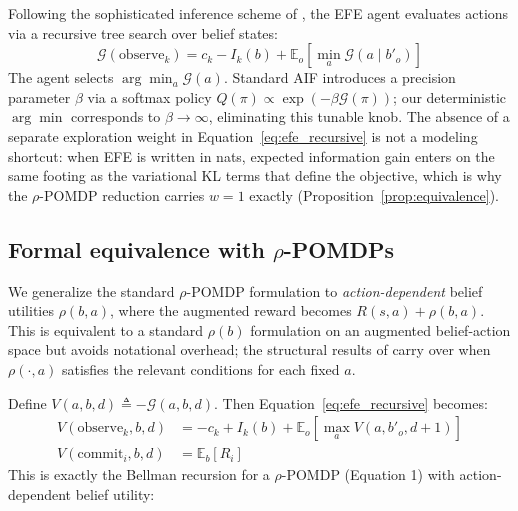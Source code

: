 \documentclass[runningheads]{llncs}
\begin{document}
Following the sophisticated inference scheme of \citet{friston2021}, the EFE agent evaluates actions via a recursive tree search over belief states:
\begin{equation}
    \mathcal{G}(\text{observe}_k) = c_k - I_k(b) + \mathbb{E}_{o}\!\left[\min_a \mathcal{G}(a \mid b'_o)\right]
    \label{eq:efe_recursive}
\end{equation}
The agent selects $\arg\min_a \mathcal{G}(a)$. Standard AIF introduces a precision parameter $\beta$ via a softmax policy $Q(\pi) \propto \exp(-\beta \mathcal{G}(\pi))$; our deterministic $\arg\min$ corresponds to $\beta \to \infty$, eliminating this tunable knob. The absence of a separate exploration weight in Equation~\ref{eq:efe_recursive} is not a modeling shortcut: when EFE is written in nats, expected information gain enters on the same footing as the variational KL terms that define the objective, which is why the $\rho$-POMDP reduction carries $w{=}1$ exactly (Proposition~\ref{prop:equivalence}).

\subsection{Formal equivalence with $\rho$-POMDPs}
\label{subsec:formal_rho_equiv}

We generalize the standard $\rho$-POMDP formulation to \emph{action-dependent} belief utilities $\rho(b, a)$, where the augmented reward becomes $R(s,a) + \rho(b,a)$. This is equivalent to a standard $\rho(b)$ formulation on an augmented belief-action space but avoids notational overhead; the structural results of \citet{araya2010} carry over when $\rho(\cdot, a)$ satisfies the relevant conditions for each fixed $a$.

Define $V(a, b, d) \triangleq -\mathcal{G}(a, b, d)$. Then Equation~\ref{eq:efe_recursive} becomes:
\begin{align}
    V(\text{observe}_k, b, d) &= -c_k + I_k(b) + \mathbb{E}_o\!\left[\max_a V(a, b'_o, d{+}1)\right] \label{eq:bellman_obs} \\
    V(\text{commit}_i, b, d) &= \mathbb{E}_b[R_i] \label{eq:bellman_commit}
\end{align}
This is exactly the Bellman recursion for a $\rho$-POMDP (Equation 1) with action-dependent belief utility:
\end{document}
